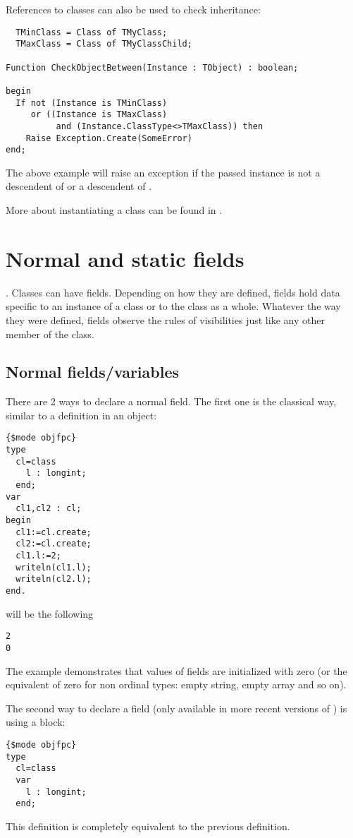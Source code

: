 References to classes can also be used to check inheritance:
\begin{verbatim}
  TMinClass = Class of TMyClass;
  TMaxClass = Class of TMyClassChild;

Function CheckObjectBetween(Instance : TObject) : boolean;

begin
  If not (Instance is TMinClass) 
     or ((Instance is TMaxClass) 
          and (Instance.ClassType<>TMaxClass)) then
    Raise Exception.Create(SomeError)
end;
\end{verbatim}
The above example will raise an exception if the passed instance
is not a descendent of  or a descendent of .

More about instantiating a class can be found in .

\section{Normal and static fields}
\label{se:classfields}.
Classes can have fields. Depending on how they are defined, fields hold data specific to 
an instance of a class or to the class as a whole. Whatever the way they were defined, 
fields observe the rules of visibilities just like any other member of the class.

\subsection{Normal fields/variables}
There are 2 ways to declare a normal field. 
The first one is the classical way, similar to a definition in an object:

\begin{verbatim}
{$mode objfpc}
type
  cl=class
    l : longint;
  end;
var
  cl1,cl2 : cl;
begin
  cl1:=cl.create;
  cl2:=cl.create;
  cl1.l:=2;
  writeln(cl1.l);
  writeln(cl2.l);
end.
\end{verbatim}
will be the following
\begin{verbatim}
2
0
\end{verbatim}
The example demonstrates that values of fields are initialized with zero (or the equivalent of zero for non ordinal types: 
empty string, empty array and so on).

The second way to declare a field (only available in more recent versions of \fpc) is using a  block:
\begin{verbatim}
{$mode objfpc}
type
  cl=class
  var
    l : longint;
  end;
\end{verbatim}
This definition is completely equivalent to the previous definition.

